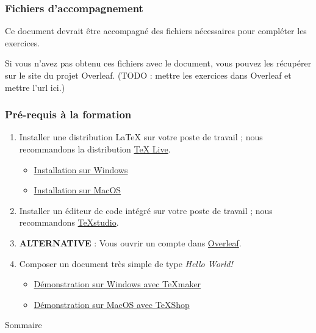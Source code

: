 
\begin{frame}[c]
	
	\frametitle{Fichiers d'accompagnement}
	
	Ce document devrait être accompagné des fichiers nécessaires pour compléter les exercices.
	
	Si vous n’avez pas obtenu ces fichiers avec le document, vous pouvez les récupérer sur le site
	du projet Overleaf. (TODO : mettre les exercices dans Overleaf et mettre l'url ici.)
	
\end{frame}


\begin{frame}
	
	\frametitle{Pré-requis à la formation}
	
	\begin{enumerate}
		
		\item Installer une distribution {\LaTeX} sur votre poste de travail ; nous
		recommandons la distribution \href{https://www.tug.org/texlive/}{TeX Live}.
		
			\begin{itemize}
				\item \href{https://youtu.be/7MfodhaghUk}{Installation sur Windows}
				\item \href{https://youtu.be/kA53EQ3Q47w}{Installation sur MacOS}
			\end{itemize}
		
		\item Installer un éditeur de code intégré sur votre poste de travail ; nous recommandons
		\href{https://www.texstudio.org/}{TeXstudio}.
		
		\item \textbf{ALTERNATIVE} : Vous ouvrir un compte dans \href{https://www.overleaf.com/}{Overleaf}.
		
		\item Composer un document très simple de type \emph{Hello World!}
		
			\begin{itemize}
				\item \href{https://youtu.be/mMgFVQhZbiM}{Démonstration sur Windows avec TeXmaker}
				\item \href{https://youtu.be/vZfiZUSsP68}{Démonstration sur MacOS avec TeXShop}
			\end{itemize}
	\end{enumerate}
	
\end{frame}


\begin{frame}{Sommaire}
	\tableofcontents
\end{frame}